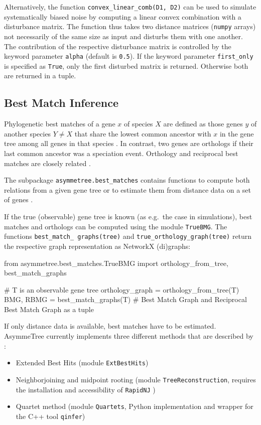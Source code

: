 \documentclass[hidelinks,11pt]{article}
\begin{document}
Alternatively, the function \texttt{convex\_linear\_comb(D1, D2)} can be used to simulate systematically biased noise by computing a linear convex combination with a disturbance matrix.
The function thus takes two distance matrices (\texttt{numpy} arrays) not necessarily of the same size as input and disturbs them with one another.
The contribution of the respective disturbance matrix is controlled by the keyword parameter \texttt{alpha} (default is \texttt{0.5}).
If the keyword parameter \texttt{first\_only} is specified as \texttt{True}, only the first disturbed matrix is returned.
Otherwise both are returned in a tuple.


\subsection{Best Match Inference}

Phylogenetic best matches of a gene $x$ of species $X$ are defined as those genes $y$ of another species $Y\ne X$ that share the lowest common ancestor with $x$ in the gene tree among all genes in that species \citep{geiss2019a,geiss2020b,geiss2020c}.
In contrast, two genes are orthologs if their last common ancestor was a speciation event.
Orthology and reciprocal best matches are closely related \citep{geiss2020c}.

The subpackage \texttt{asymmetree.best\_matches} contains functions to compute both relations from a given gene tree or to estimate them from distance data on a set of genes \citep{stadler2020}.

If the true (observable) gene tree is known (as e.g.\ the case in simulations), best matches and orthologs can be computed using the module \texttt{TrueBMG}.
The functions \texttt{best\_match\_ graphs(tree)} and \texttt{true\_orthology\_graph(tree)} return the respective graph representation as NetworkX (di)graphs:

\vspace{2mm}
\begin{python}
from asymmetree.best_matches.TrueBMG import orthology_from_tree, best_match_graphs

# T is an observable gene tree
orthology_graph = orthology_from_tree(T)
BMG, RBMG = best_match_graphs(T)    # Best Match Graph and Reciprocal Best Match Graph as a tuple
\end{python}
\vspace{2mm}

If only distance data is available, best matches have to be estimated.
AsymmeTree currently implements three different methods that are described by \citet{stadler2020}:
\begin{itemize}
	\item Extended Best Hits (module \texttt{ExtBestHits})
	\item Neighborjoining and midpoint rooting (module \texttt{TreeReconstruction}, requires the installation and accessibility of \texttt{RapidNJ} \citep{simonsen2008})
	\item Quartet method (module \texttt{Quartets}, Python implementation and wrapper for the C++ tool \texttt{qinfer})
\end{itemize}
\end{document}
